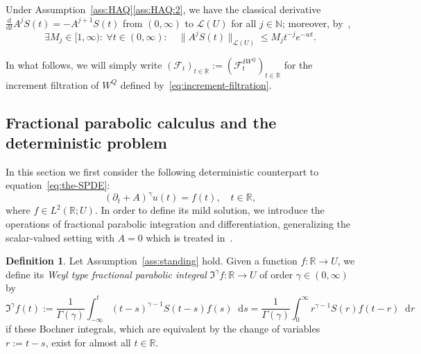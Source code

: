 \documentclass[reqno]{amsart}
\numberwithin{equation}{section}
\newcommand{\bbR}{\mathbb{R}}
\newcommand{\R}{\mathbb{R}}
\newcommand{\N}{\mathbb{N}}
\newcommand{\cF}{\mathcal{F}}
\newcommand{\norm}[2]{     \| #1       \|_{ #2 }}
\newcommand{\rd}{\mathop{}\!\mathrm{d}}
\newcommand{\from}{\colon}
\theoremstyle{remark}
\theoremstyle{definition}
\newtheorem{definition}[lemma]{Definition}
\begin{document}
Under Assumption~\ref{ass:HAQ}\ref{ass:HAQ:2},
we have the classical derivative 
$\frac{\mathrm d}{\mathrm d t}A^j S(t) = -A^{j+1}S(t)$
from $(0,\infty)$ to $\mathscr L(U)$ for all $j \in \N$;
moreover, by~\cite[Chapter~2, Theorem~6.13(c)]{Pazy1983},
%
\begin{equation}\label{eq:analytic-semigroup-est}
	\exists M_j \in [1,\infty) \colon \: \forall t \in (0,\infty) : \quad
	\norm{A^j S(t)}{\mathscr L(U)} \le M_j t^{-j} e^{-wt}.
\end{equation}
%

In what follows, we will simply write $(\cF_t)_{t \in \bbR} := (\cF^{\delta W^Q}_{t})_{t\in\bbR}$
for the increment filtration of $W^Q$ defined by~\eqref{eq:increment-filtration}.

\subsection{Fractional parabolic calculus and the deterministic problem}
\label{subsec:fractional-int-diff}
In this section we first consider the following deterministic counterpart to equation~\eqref{eq:the-SPDE}:
%
\begin{equation}\label{eq:the-PDE}
	(\partial_t + A)^\gamma u(t) = f(t), \quad t \in \R,
\end{equation}
%
where $f \in L^2(\R; U)$.
In order to define its mild solution,
we introduce the operations of fractional parabolic integration and differentiation,
generalizing the scalar-valued setting with $A = 0$ which is treated in~\cite[Chapter~2]{KST2006}.

\begin{definition}\label{def:Weyl-fractional-parabolic-integral}
	Let Assumption~\ref{ass:standing} hold.
	Given a function $f \from \R \to U$, we define its \emph{Weyl type fractional parabolic integral} 
	$\mathfrak I^\gamma f \from \R \to U$ of order $\gamma \in (0,\infty)$
	by
	\begin{equation}\label{eq:def-Igamma}
		\mathfrak I^\gamma f(t) 
		:= \frac{1}{\Gamma(\gamma)} \int_{-\infty}^t (t-s)^{\gamma-1} S(t-s) f(s) \rd s
		=
		\frac{1}{\Gamma(\gamma)} \int_{0}^\infty r^{\gamma-1} S(r) f(t-r) \rd r
	\end{equation}
	if these Bochner integrals,
	which are equivalent by the change of variables ${r := t - s}$,
	exist for almost all $t \in \R$.
\end{definition}
\end{document}
